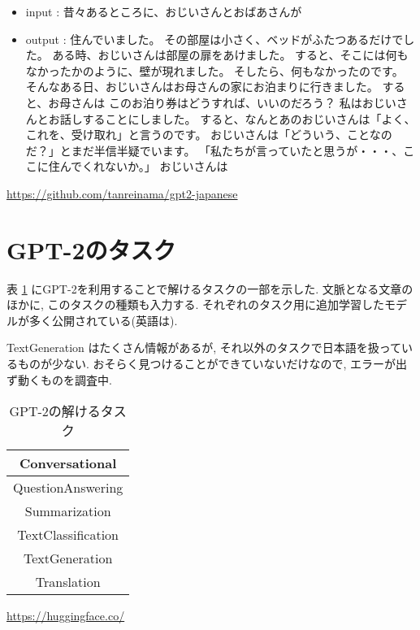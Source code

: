 \documentclass[twocolumn]{jarticle}     %
\begin{document}
\begin{itemize}
  \item input : 昔々あるところに、おじいさんとおばあさんが
  \item output : 住んでいました。
その部屋は小さく、ベッドがふたつあるだけでした。
ある時、おじいさんは部屋の扉をあけました。
すると、そこには何もなかったかのように、壁が現れました。
そしたら、何もなかったのです。
そんなある日、おじいさんはお母さんの家にお泊まりに行きました。
すると、お母さんは
このお泊り券はどうすれば、いいのだろう？
私はおじいさんとお話しすることにしました。
すると、なんとあのおじいさんは「よく、これを、受け取れ」と言うのです。
おじいさんは「どういう、ことなのだ？」とまだ半信半疑でいます。
「私たちが言っていたと思うが・・・、ここに住んでくれないか。」
おじいさんは
\end{itemize}

\url{https://github.com/tanreinama/gpt2-japanese}

\section{GPT-2のタスク}
表 \ref{tab:task} にGPT-2を利用することで解けるタスクの一部を示した.
文脈となる文章のほかに, このタスクの種類も入力する.
それぞれのタスク用に追加学習したモデルが多く公開されている(英語は).

TextGeneration はたくさん情報があるが,
それ以外のタスクで日本語を扱っているものが少ない.
おそらく見つけることができていないだけなので, エラーが出ず動くものを調査中.

\begin{table}[tb]
  \begin{center}
    \caption{GPT-2の解けるタスク}
    \begin{tabular}{|c|} \hline
      Conversational \\ \hline
      QuestionAnswering \\ \hline
      Summarization \\ \hline
      TextClassification \\ \hline
      TextGeneration \\ \hline
      Translation \\ \hline
    \end{tabular}
    \label{tab:task}
  \end{center}
\end{table}
\url{https://huggingface.co/}
\end{document}
